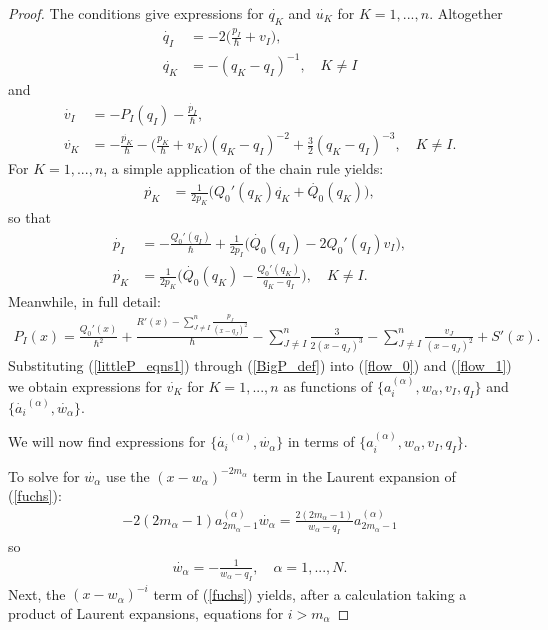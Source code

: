 \documentclass[a4paper,12pt,reqno]{amsart}
\numberwithin{equation}{section}
\numberwithin{counter2}{section}
\begin{document}
\begin{proof}
The conditions give expressions for $\dot{q_K}$ and $\dot{u_K}$ for $K = 1,...,n$.
 Altogether 
 \begin{align}
 \dot{q_I} &= -2\Big(\frac{p_I}{\hbar} + v_I\Big), \\
  \dot{q_K} &= -(q_K-q_I)^{-1},  \quad K \ne I  
 \end{align}
 and 
 \begin{align}
 \dot{v_I} &= -P_I(q_I) - \frac{\dot{p_I}}{\hbar}, \label{flow_0} \ \\
 \dot{v_K} &= - \frac{\dot{p_K}}{\hbar} - \Big(\frac{p_K}{\hbar} + v_K\Big)(q_K-q_I)^{-2} + \frac{3}{2}(q_K-q_I)^{-3},  \quad K \ne I. \label{flow_1}
 \end{align}
For $K = 1,...,n$,  a simple application of the chain rule yields:
 \begin{align}
 \dot{p_K} &= \frac{1}{2p_K}\big(Q_0'(q_K)\dot{q_K} + \dot{Q_0}(q_K)\big),
 \end{align}
so that 
 \begin{align}\label{littleP_eqns1}
 \dot{p_I} &= -\frac{Q_0'(q_I)}{\hbar} + \frac{1}{2p_I}\big(\dot{Q_0}(q_I)-2Q_0'(q_I)v_I \big), \\
  \dot{p_K} &=  \frac{1}{2p_K}\Bigg(\dot{Q_0}(q_K) - \frac{Q_0'(q_K)}{q_K-q_I} \Bigg), \quad   K \ne I.\label{littleP_eqns2}
 \end{align}
Meanwhile,  in full detail:
 \begin{align}\label{BigP_def}
P_I(x) = \frac{Q_0'(x)}{\hbar^2} + \frac{R'(x) - \sum\limits_{J\ne I}^n\frac{p_J}{(x-q_J)^2}}{\hbar} - \sum_{J\ne I}^n\frac{3}{2(x-q_J)^3} - \sum_{J \ne I}^n\frac{v_J}{(x-q_J)^2} +S'(x).  
 \end{align}
Substituting (\ref{littleP_eqns1}) through (\ref{BigP_def}) into (\ref{flow_0}) and (\ref{flow_1}) we obtain expressions for $\dot{v_K}$ for $K = 1,...,n$ as functions of $\{a_i^{(\alpha)},  w_\alpha,  v_I,  q_{I}\}$ and $\{\dot{a_i}^{(\alpha)},\dot{w_\alpha}\}$.  \par We will now find expressions for $\{\dot{a_i}^{(\alpha)},\dot{w_\alpha}\}$ in terms of $\{a_i^{(\alpha)},w_\alpha,  v_I,  q_{I}\}$.  \par 
To solve for $\dot{w_\alpha}$ use the $(x-w_\alpha)^{-2m_\alpha}$ term in the Laurent expansion of (\ref{fuchs}):
\begin{align}
-2(2m_\alpha-1){a_{2m_\alpha-1}^{(\alpha)}\dot{w_\alpha}} = \frac{2(2m_\alpha-1)}{w_\alpha - q_I} {a_{2m_\alpha-1}^{(\alpha)}}
\end{align}
so 
\begin{align}
\dot{w_\alpha} = -\frac{1}{w_\alpha-q_I},  \quad \alpha = 1,...,N.  
\end{align}
Next,  the $(x-w_\alpha)^{-i}$ term of (\ref{fuchs}) yields,  after a calculation taking a product of Laurent expansions,  equations for $i > m_\alpha$



\end{proof}
\end{document}
